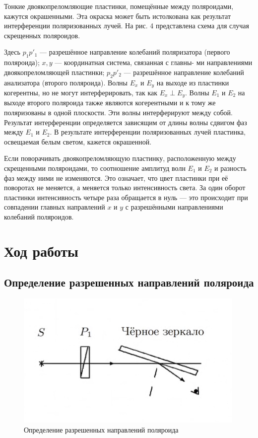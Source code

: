 \documentclass[a4paper, 12pt]{article}
\begin{document}
Тонкие двоякопреломляющие пластинки, помещённые между поляроидами, кажутся окрашенными. Эта окраска может быть истолкована как результат интерференции поляризованных лучей. На рис. 4 представлена схема для
случая скрещенных поляроидов.

Здесь $ p_1p'_1 $ --- разрешённое направление колебаний поляризатора
(первого поляроида); $ x, y $ --- координатная система, связанная с главны-
ми направлениями двоякопреломляющей пластинки; $ p_2p'_2 $ --- разрешённое направление колебаний анализатора (второго поляроида). Волны
$ E_x  $ и $ E_y $ на выходе из пластинки когерентны, но не могут интерферировать, так как $ E_x \perp  E_y $. Волны $ E_1 $ и $ E_2 $ на выходе второго поляроида
также являются когерентными и к тому же поляризованы в одной плоскости. Эти волны интерферируют между собой. Результат интерференции определяется зависящим от длины волны сдвигом фаз между $ E_1 $
и $ E_2 $. В результате интерференции поляризованных лучей пластинка, освещаемая белым светом, кажется окрашенной.

Если поворачивать двоякопреломляющую пластинку, расположенную между
скрещенными поляроидами, то соотношение амплитуд волн $ E_1 $ и $ E_2 $ и разность фаз между ними не изменяются. Это означает, что цвет пластинки при её поворотах не меняется, а меняется только интенсивность света. За один оборот пластинки интенсивность четыре раза обращается в нуль --- это происходит при совпадении главных направлений
$ x $ и $ y $ с разрешёнными направлениями колебаний поляроидов.

\section{Ход работы}
\subsection{Определение разрешенных направлений поляроида}

\begin{figure}
	\includegraphics[width=\linewidth]{5}
	\caption{Определение разрешенных направлений поляроида}
	\label{ris 5}
\end{figure}
\end{document}
